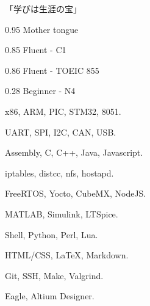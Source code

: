 \documentclass{faresume}
\begin{document}
\begin{column}[\rightcolumnwidth]


		\addcontent
		{
			{\Large\begin{CJK}{UTF8}{min}「学びは生涯の宝」\end{CJK}}
		}{}{}{}{}


		{}{}{}{}

		{}{}{}{}

		{}{}{}{}

		{}{}{}{}

		{}{}{}{}


			{0.95}
			{Mother tongue}
			{}{}{}

			{0.85}
			{Fluent - C1}
			{}{}{}

			{0.86}
			{Fluent - TOEIC 855}
			{}{}{}

			{0.28}
			{Beginner - N4}
			{}{}{}


			{x86, ARM, PIC, STM32, 8051.}
			{}{}{}{}

			{UART, SPI, I2C, CAN, USB.}
			{}{}{}{}

			{Assembly, C, C++, Java, Javascript.}
			{}{}{}{}

            {iptables, distcc, nfs, hostapd.}
            {}{}{}{}

			{FreeRTOS, Yocto, CubeMX, NodeJS.}
			{}{}{}{}

			{MATLAB, Simulink, LTSpice.}
			{}{}{}{}

			{Shell, Python, Perl, Lua.}
			{}{}{}{}

			{HTML/CSS, {\LaTeX}, Markdown.}
			{}{}{}{}

			{Git, SSH, Make, Valgrind.}
			{}{}{}{}

			{Eagle, Altium Designer.}
			{}{}{}{}


\end{column}
\end{document}
